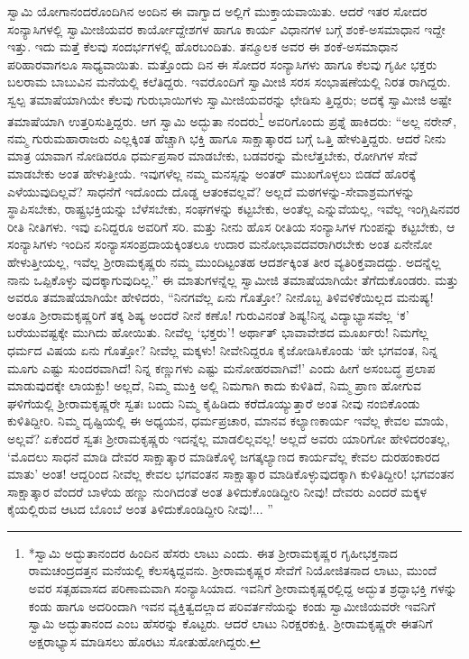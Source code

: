 ಸ್ವಾಮಿ ಯೋಗಾನಂದರೊಂದಿಗಿನ ಅಂದಿನ ಈ ವಾಗ್ವಾದ ಅಲ್ಲಿಗೆ ಮುಕ್ತಾಯವಾಯಿತು. ಆದರೆ ಇತರ ಸೋದರ ಸಂನ್ಯಾಸಿಗಳಲ್ಲಿ ಸ್ವಾಮೀಜಿಯವರ ಕಾರ್ಯೋದ್ದೇಶಗಳ ಹಾಗೂ ಕಾರ್ಯ ವಿಧಾನಗಳ ಬಗ್ಗೆ ಶಂಕೆ-ಅಸಮಾಧಾನ ಇದ್ದೇ ಇತ್ತು. ಇದು ಮತ್ತೆ ಕೆಲವು ಸಂದರ್ಭಗಳಲ್ಲಿ ಹೊರಬಂದಿತು. ತನ್ಮೂಲಕ ಅವರ ಈ ಶಂಕೆ-ಅಸಮಾಧಾನ ಪರಿಹಾರವಾಗಲೂ ಸಾಧ್ಯವಾಯಿತು. ಮತ್ತೊಂದು ದಿನ ಈ ಸೋದರ ಸಂನ್ಯಾಸಿಗಳು ಹಾಗೂ ಕೆಲವು ಗೃಹೀ ಭಕ್ತರು ಬಲರಾಮ ಬಾಬುವಿನ ಮನೆಯಲ್ಲಿ ಕಲೆತಿದ್ದರು. ಇವರೊಂದಿಗೆ ಸ್ವಾಮೀಜಿ ಸರಸ ಸಂಭಾಷಣೆಯಲ್ಲಿ ನಿರತ ರಾಗಿದ್ದರು. ಸ್ವಲ್ಪ ತಮಾಷೆಯಾಗಿಯೇ ಕೆಲವು ಗುರುಭಾಯಿಗಳು ಸ್ವಾಮೀಜಿಯವರನ್ನು ಛೇಡಿಸು ತ್ತಿದ್ದರು; ಅದಕ್ಕೆ ಸ್ವಾಮೀಜಿ ಅಷ್ಟೇ ತಮಾಷೆಯಾಗಿ ಉತ್ತರಿಸುತ್ತಿದ್ದರು. ಆಗ ಸ್ವಾಮಿ ಅದ್ಭುತಾ ನಂದರು\footnote{*ಸ್ವಾಮಿ ಅದ್ಭುತಾನಂದರ ಹಿಂದಿನ ಹೆಸರು ಲಾಟು ಎಂದು. ಈತ ಶ್ರೀರಾಮಕೃಷ್ಣರ ಗೃಹೀಭಕ್ತನಾದ ರಾಮಚಂದ್ರದತ್ತನ ಮನೆಯಲ್ಲಿ ಕೆಲಸಕ್ಕಿದ್ದವನು. ಶ್ರೀರಾಮಕೃಷ್ಣರ ಸೇವೆಗೆ ನಿಯೋಜಿತನಾದ ಲಾಟು, ಮುಂದೆ ಅವರ ಸತ್ಸಹವಾಸದ ಪರಿಣಾಮವಾಗಿ ಸಂನ್ಯಾಸಿಯಾದ. ಇವನಿಗೆ ಶ್ರೀರಾಮಕೃಷ್ಣರಲ್ಲಿದ್ದ ಅದ್ಭುತ ಶ್ರದ್ಧಾಭಕ್ತಿ ಗಳನ್ನು ಕಂಡು ಹಾಗೂ ಅದರಿಂದಾಗಿ ಇವನ ವ್ಯಕ್ತಿತ್ವದಲ್ಲಾದ ಪರಿವರ್ತನೆಯನ್ನು ಕಂಡು ಸ್ವಾಮೀಜಿಯವರೇ ಇವನಿಗೆ ಸ್ವಾಮಿ ಅದ್ಭುತಾನಂದ ಎಂಬ ಹೆಸರನ್ನು ಕೊಟ್ಟರು. ಆದರೆ ಲಾಟು ನಿರಕ್ಷರಕುಕ್ಷಿ. ಶ್ರೀರಾಮಕೃಷ್ಣರೇ ಈತನಿಗೆ ಅಕ್ಷರಾಭ್ಯಾಸ ಮಾಡಿಸಲು ಹೊರಟು ಸೋತುಹೋಗಿದ್ದರು.} ಅವರಿಗೊಂದು ಪ್ರಶ್ನೆ ಹಾಕಿದರು: “ಅಲ್ಲ ನರೇನ್, ನಮ್ಮ ಗುರುಮಹಾರಾಜರು ಎಲ್ಲಕ್ಕಿಂತ ಹೆಚ್ಚಾಗಿ ಭಕ್ತಿ ಹಾಗೂ ಸಾಕ್ಷಾತ್ಕಾರದ ಬಗ್ಗೆ ಒತ್ತಿ ಹೇಳುತ್ತಿದ್ದರು. ಆದರೆ ನೀನು ಮಾತ್ರ ಯಾವಾಗ ನೋಡಿದರೂ ಧರ್ಮಪ್ರಸಾರ ಮಾಡಬೇಕು, ಬಡವರನ್ನು ಮೇಲೆತ್ತಬೇಕು, ರೋಗಿಗಳ ಸೇವೆ ಮಾಡಬೇಕು ಅಂತ ಹೇಳುತ್ತೀಯೆ. ಇವುಗಳೆಲ್ಲ ನಮ್ಮ ಮನಸ್ಸನ್ನು ಅಂತರ್ ಮುಖಗೊಳ್ಳಲು ಬಿಡದೆ ಹೊರಕ್ಕೆ ಎಳೆಯುವುದಿಲ್ಲವೆ? ಸಾಧನೆಗೆ ಇದೊಂದು ದೊಡ್ಡ ಆತಂಕವಲ್ಲವೆ? ಅಲ್ಲದೆ ಮಠಗಳನ್ನು-ಸೇವಾಶ್ರಮಗಳನ್ನು ಸ್ಥಾಪಿಸಬೇಕು, ರಾಷ್ಟ್ರಭಕ್ತಿಯನ್ನು ಬೆಳೆಸಬೇಕು, ಸಂಘಗಳನ್ನು ಕಟ್ಟಬೇಕು, ಅಂತೆಲ್ಲ ಎನ್ನುವೆಯಲ್ಲ, ಇವೆಲ್ಲ ಇಂಗ್ಲಿಷಿನವರ ರೀತಿ ನೀತಿಗಳು. ಇವು ಏನಿದ್ದರೂ ಅವರಿಗೆ ಸರಿ. ಮತ್ತು ನೀನು ಹೊಸ ರೀತಿಯ ಸಂನ್ಯಾಸಿಗಳ ಗುಂಪನ್ನು ಕಟ್ಟಬೇಕು, ಆ ಸಂನ್ಯಾಸಿಗಳು ಇಂದಿನ ಸಂನ್ಯಾಸಸಂಪ್ರದಾಯಕ್ಕಿಂತಲೂ ಉದಾರ ಮನೋಭಾವದವರಾಗಿರಬೇಕು ಅಂತ ಏನೇನೋ ಹೇಳುತ್ತೀಯಲ್ಲ, ಇವೆಲ್ಲ ಶ್ರೀರಾಮಕೃಷ್ಣರು ನಮ್ಮ ಮುಂದಿಟ್ಟಂತಹ ಆದರ್ಶಕ್ಕಿಂತ ತೀರ ವ್ಯತಿರಿಕ್ತವಾದದ್ದು. ಅದನ್ನೆಲ್ಲ ನಾನು ಒಪ್ಪಿಕೊಳ್ಳು ವುದಕ್ಕಾಗುವುದಿಲ್ಲ.” ಈ ಮಾತುಗಳನ್ನೆಲ್ಲ ಸ್ವಾಮೀಜಿ ತಮಾಷೆಯಾಗಿಯೇ ತೆಗೆದುಕೊಂಡರು. ಮತ್ತು ಅವರೂ ತಮಾಷೆಯಾಗಿಯೇ ಹೇಳಿದರು, “ನಿನಗವೆಲ್ಲ ಏನು ಗೊತ್ತೋ? ನೀನೊಬ್ಬ ತಿಳಿವಳಿಕೆಯಿಲ್ಲದ ಮನುಷ್ಯ! ಅಂತೂ ಶ್ರೀರಾಮಕೃಷ್ಣರಿಗೆ ತಕ್ಕ ಶಿಷ್ಯ ಅಂದರೆ ನೀನೆ ಕಣೊ! ಗುರುವಿನಂತೆ ಶಿಷ್ಯ!ನಿನ್ನ ವಿದ್ಯಾಭ್ಯಾಸವೆಲ್ಲ ‘ಕ’ ಬರೆಯುವಷ್ಟಕ್ಕೇ ಮುಗಿದು ಹೋಯಿತು. ನೀವೆಲ್ಲ ‘ಭಕ್ತರು’! ಅರ್ಥಾತ್ ಭಾವಾವೇಶದ ಮೂರ್ಖರು! ನಿಮಗೆಲ್ಲ ಧರ್ಮದ ವಿಷಯ ಏನು ಗೊತ್ತೋ? ನೀವೆಲ್ಲ ಮಕ್ಕಳು! ನೀವೇನಿದ್ದರೂ ಕೈಜೋಡಿಸಿಕೊಂಡು ‘ಹೇ ಭಗವಂತ, ನಿನ್ನ ಮೂಗು ಎಷ್ಟು ಸುಂದರವಾಗಿದೆ! ನಿನ್ನ ಕಣ್ಣುಗಳು ಎಷ್ಟು ಮನೋಹರವಾಗಿವೆ!’ ಎಂದು ಹೀಗೆ ಅಸಂಬದ್ಧ ಪ್ರಲಾಪ ಮಾಡುವುದಕ್ಕೇ ಲಾಯಕ್ಖು! ಅಲ್ಲದೆ, ನಿಮ್ಮ ಮುಕ್ತಿ ಅಲ್ಲಿ ನಿಮಗಾಗಿ ಕಾದು ಕುಳಿತಿದೆ, ನಿಮ್ಮ ಪ್ರಾಣ ಹೋಗುವ ಘಳಿಗೆಯಲ್ಲಿ ಶ್ರೀರಾಮಕೃಷ್ಣರೇ ಸ್ವತಃ ಬಂದು ನಿಮ್ಮ ಕೈಹಿಡಿದು ಕರೆದೊಯ್ಯುತ್ತಾರೆ ಅಂತ ನೀವು ನಂಬಿಕೊಂಡು ಕುಳಿತಿದ್ದೀರಿ. ನಿಮ್ಮ ದೃಷ್ಟಿಯಲ್ಲಿ ಈ ಅಧ್ಯಯನ, ಧರ್ಮಪ್ರಚಾರ, ಮಾನವ ಕಲ್ಯಾಣಕಾರ್ಯ ಇವೆಲ್ಲ ಕೇವಲ ಮಾಯೆ, ಅಲ್ಲವೆ? ಏಕೆಂದರೆ ಸ್ವತಃ ಶ್ರೀರಾಮಕೃಷ್ಣರು ಇದನ್ನೆಲ್ಲ ಮಾಡಲಿಲ್ಲವಲ್ಲ! ಅಲ್ಲದೆ ಅವರು ಯಾರಿಗೋ ಹೇಳಿದರಂತಲ್ಲ, ‘ಮೊದಲು ಸಾಧನೆ ಮಾಡಿ ದೇವರ ಸಾಕ್ಷಾತ್ಕಾರ ಮಾಡಿಕೊಳ್ಳಿ ಜಗತ್ಕಲ್ಯಾಣದ ಕಾರ್ಯವೆಲ್ಲ ಕೇವಲ ದುರಹಂಕಾರದ ಮಾತು’ ಅಂತ! ಆದ್ದರಿಂದ ನೀವೆಲ್ಲ ಕೇವಲ ಭಗವಂತನ ಸಾಕ್ಷಾತ್ಕಾರ ಮಾಡಿಕೊಳ್ಳುವುದಕ್ಕಾಗಿ ಕುಳಿತಿದ್ದೀರಿ! ಭಗವಂತನ ಸಾಕ್ಷಾತ್ಕಾರ ವೆಂದರೆ ಬಾಳೆಯ ಹಣ್ಣು ನುಂಗಿದಂತೆ ಅಂತ ತಿಳಿದುಕೊಂಡಿದ್ದೀರಿ ನೀವು! ದೇವರು ಎಂದರೆ ಮಕ್ಕಳ ಕೈಯಲ್ಲಿರುವ ಆಟದ ಬೊಂಬೆ ಅಂತ ತಿಳಿದುಕೊಂಡಿದ್ದೀರಿ ನೀವು!... ”

